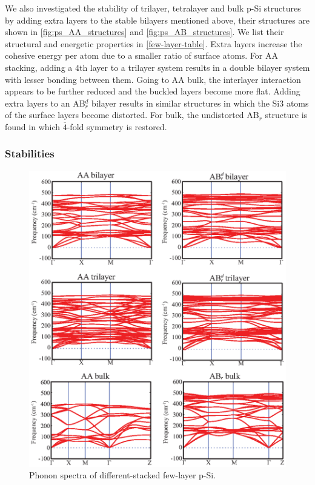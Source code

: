 We also investigated the stability of trilayer, tetralayer and bulk p-Si structures by adding extra layers to the stable bilayers mentioned above, their structures are shown in \autoref{fig:ps_AA_structures} and \autoref{fig:ps_AB_structures}. We list their structural and energetic properties in \autoref{few-layer-table}. Extra layers increase the cohesive energy per atom due to a smaller ratio of surface atoms. For AA stacking, adding a 4th layer to a trilayer system results in a double bilayer system with lesser bonding between them. Going to AA bulk, the interlayer interaction appears to be further reduced and the buckled layers become more flat. Adding extra layers to an AB$_r^d$ bilayer results in similar structures in which the Si3 atoms of the surface layers become distorted. For bulk, the undistorted AB$_r$ structure is found in which $\overline{4}$-fold symmetry is restored.



\subsubsection{Stabilities}\label{stab}

\begin{figure}[htb]
\centering
\includegraphics[width=0.9\linewidth]{ps_phonon_spectrum.eps}%
\caption{Phonon spectra of different-stacked few-layer p-Si. \label{fig:ps_phonon}}
\end{figure}

